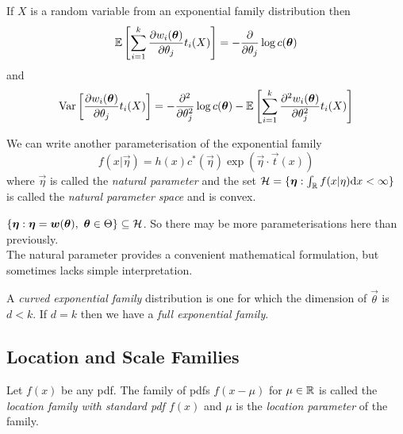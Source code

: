 \begin{theorem}
    If $X$ is a random variable from an exponential family distribution then
    \[
        \mathbb{E}{}\left[ \sum_{i=1}^k \frac{\partial w_i(\bm{\theta})}{\partial \theta_j} t_i(X) \right] = - \frac{\partial}{\partial \theta_j} \log c(\bm{\theta})
    \]
    and
    \[
        \text{Var}\left[ \frac{\partial w_i(\bm{\theta})}{\partial \theta_j} t_i(X) \right] = - \frac{\partial^2}{\partial \theta_j^2} \log c(\bm{\theta}) - \mathbb{E}{}\left[ \sum_{i=1}^{k} \frac{\partial^2 w_i(\bm{\theta})}{\partial \theta_j^2} t_i(X) \right]
    \]
\end{theorem}

\begin{definition}
    We can write another parameterisation of the exponential family
    \[
        f(x | \vec{\eta}) = h(x) c^{*}(\vec{\eta}) \exp(\vec{\eta} \cdot \vec{t}(x))
    \]
    where $\vec{\eta}$ is called the \emph{natural parameter} and the set $\mathcal{H}{} = \{\bm{\eta} : \int_{\mathbb{R}}{} f(x|\eta) \text{d} x < \infty \}$ is called the \emph{natural parameter space} and is convex.
\end{definition}

\begin{remark}
    $\{\bm{\eta}: \bm{\eta} = \bm{w}(\bm{\theta}), \,\, \bm{\theta} \in \Theta\} \subseteq \mathcal{H}{}$. So there may be more parameterisations here than previously.\\
    
The natural parameter provides a convenient mathematical formulation, but sometimes lacks simple interpretation.
\end{remark}

\begin{definition}
    A \emph{curved exponential family} distribution is one for which the dimension of $\vec{\theta}$ is $d < k$. If $d = k$ then we have a \emph{full exponential family}.
\end{definition}

\subsection{Location and Scale Families}

\begin{definition}
    Let $f(x)$ be any pdf. The family of pdfs $f(x - \mu)$ for $\mu \in \mathbb{R}{}$ is called the \emph{location family with standard pdf $f(x)$} and $\mu$ is the \emph{location parameter} of the family.
\end{definition}

